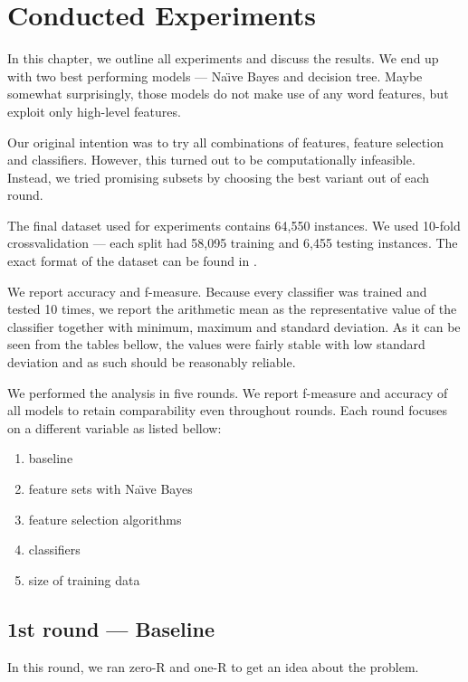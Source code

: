 \chapter{Conducted Experiments}\label{chap:exp}

In this chapter, we outline all experiments and discuss the results.
We end up with two best performing models --- Na\"{\i}ve Bayes and decision tree.
Maybe somewhat surprisingly, those models do not make use of any word features,
but exploit only high-level features.

Our original intention was to try all combinations of features, feature selection and classifiers.
However, this turned out to be computationally infeasible.
Instead, we tried promising subsets by choosing the best variant out of each round.

The final dataset used for experiments contains  64,550 instances.
We used 10-fold crossvalidation --- each split had
58,095 training and 6,455 testing instances.
The exact format of the dataset can be found in .

We report accuracy and f-measure.
Because every classifier was trained and tested 10 times,
we report the arithmetic mean as the representative value of the classifier
together with minimum, maximum and standard deviation.
As it can be seen from the tables bellow, 
the values were fairly stable with low standard deviation and
as such should be reasonably reliable.

We performed the analysis in five rounds.
We report f-measure and accuracy of all models to retain comparability even throughout rounds.
Each round focuses on a different variable as listed bellow:

\begin{enumerate}
	\item baseline
	\item feature sets with Na\"{\i}ve Bayes
	\item feature selection algorithms
	\item classifiers
	\item size of training data
\end{enumerate}


\section{1st round --- Baseline}

In this round, we ran zero-R and one-R to get an idea about the problem.


